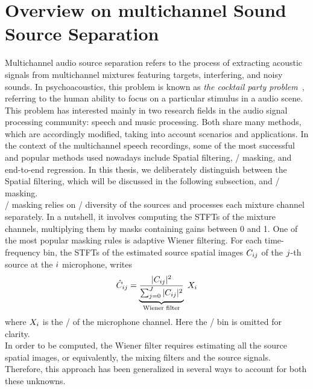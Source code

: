 \section{Overview on multichannel Sound Source Separation}\label{sec:application:separation}
Multichannel audio source separation refers to the process of extracting acoustic signals from multichannel mixtures featuring targets, interfering, and noisy sounds.
In psychoacoustics, this problem is known as \textit{the cocktail party problem}~, referring to the human ability to focus on a particular stimulus in a audio scene.
This problem has interested mainly in two research fields in the audio signal processing community: speech and music processing.
Both share many methods, which are accordingly modified, taking into account scenarios and applications.
In the context of the multichannel speech recordings, some of the most successful and popular methods used nowadays
include Spatial filtering, \TF/ masking, and end-to-end regression.
In this thesis, we deliberately distinguish between the Spatial filtering, which will be discussed in the following subsection, and \TF/ masking.
\\\TF/ masking relies on \TF/ diversity of the sources and processes each mixture channel separately.
In a nutshell, it involves computing the \acp{STFT} of the mixture channels, multiplying them by masks containing gains between 0 and 1.
One of the most popular masking rules is adaptive Wiener filtering.
For each time-frequency bin, the \acp{STFT} of the estimated source spatial images $C_{ij}$ of the $j$-th source at the $i$ microphone, writes
\begin{equation}
        \hat{C}_{ij} = \underbrace{\frac{|{C_{ij}}|^2}
                                        {\sum_{j=0}^{J} |{C_{ij}}|^2}}
                                        _{\text{Wiener filter}} \; X_{i}
\end{equation}
where $X_{i}$ is the \STFT/ of the microphone channel. Here the \TF/ bin is omitted for clarity.
\\In order to be computed, the Wiener filter requires estimating all the source spatial images, or equivalently, the mixing filters and the source signals.
Therefore, this approach has been generalized in several ways to account for both these unknowns.
